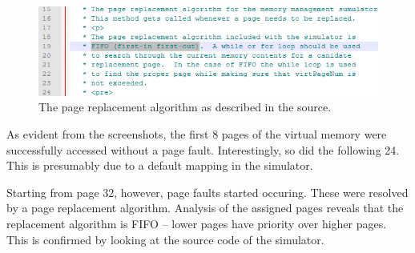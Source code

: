 \documentclass{article}
\begin{document}
	\begin{figure}[h]
		\begin{center}
			\includegraphics[width=1\linewidth]{screenshot4.png}
			\caption{The page replacement algorithm as described in the source.}
			\label{fig:topview}
		\end{center}
	\end{figure}
	
	\clearpage
	
	As evident from the screenshots, the first 8 pages of the virtual memory
	were successfully accessed without a page fault. Interestingly, so did the
	following 24. This is presumably due to a default mapping in the simulator.
	
	Starting from page 32, however, page faults started occuring. These were
	resolved by a page replacement algorithm. Analysis of the assigned pages
	reveals that the replacement algorithm is FIFO -- lower pages have priority
	over higher pages. This is confirmed by looking at the source code of the
	simulator.
	
\end{document}
